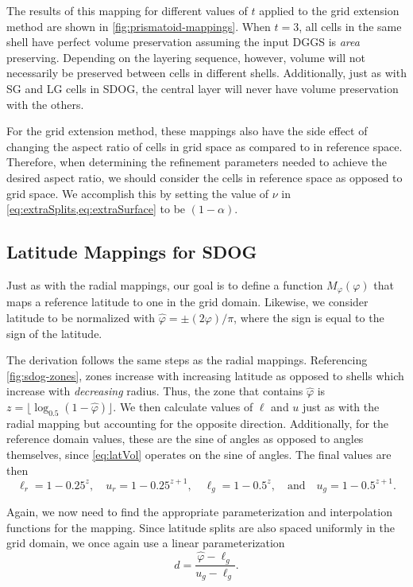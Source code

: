 The results of this mapping for different values of $t$ applied to the grid extension method are shown in \cref{fig:prismatoid-mappings}.
When $t=3$, all cells in the same shell have perfect volume preservation assuming the input DGGS is \textit{area} preserving.
Depending on the layering sequence, however, volume will not necessarily be preserved between cells in different shells.
Additionally, just as with SG and LG cells in SDOG, the central layer will never have volume preservation with the others.


For the grid extension method, these mappings also have the side effect of changing the aspect ratio of cells in grid space as compared to in reference space.
Therefore, when determining the refinement parameters needed to achieve the desired aspect ratio, we should consider the cells in reference space as opposed to grid space.
We accomplish this by setting the value of $\nu$ in \cref{eq:extraSplits,eq:extraSurface} to be $(1 - \alpha)$.


\subsection{Latitude Mappings for SDOG} \label{chap:6:latitude}
Just as with the radial mappings, our goal is to define a function $M_\varphi(\varphi)$ that maps a reference latitude to one in the grid domain. Likewise, we consider latitude to be normalized with $\hat{\varphi} = \pm (2\varphi) / \pi$, where the sign is equal to the sign of the latitude.


The derivation follows the same steps as the radial mappings.
Referencing \cref{fig:sdog-zones}, zones increase with increasing latitude as opposed to shells which increase with \textit{decreasing} radius.
Thus, the zone that contains $\hat{\varphi}$ is $z = \lfloor \log_{0.5} ( 1 - \hat{\varphi} ) \rfloor$.
We then calculate values of $\ell$ and $u$ just as with the radial mapping but accounting for the opposite direction.
Additionally, for the reference domain values, these are the sine of angles as opposed to angles themselves, since \cref{eq:latVol} operates on the sine of angles.
The final values are then
%
\begin{equation*}
\ell_r = 1 - 0.25^{z}, \quad u_r = 1 - 0.25^{z + 1}, \quad \ell_g = 1 - 0.5^z, \quad \text{and} \quad u_g = 1 - 0.5^{z + 1}.
\end{equation*}
%

Again, we now need to find the appropriate parameterization and interpolation functions for the mapping.
Since latitude splits are also spaced uniformly in the grid domain, we once again use a linear parameterization
%
\begin{equation} \label{eq:latInvD}
d = \frac{ \hat{\varphi} - \ell_g }{ u_g - \ell_g }.
\end{equation}

